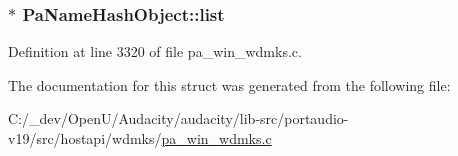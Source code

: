 \subsubsection[{\texorpdfstring{list}{list}}]{$\ast$ Pa\+Name\+Hash\+Object\+::list}\hypertarget{struct_pa_name_hash_object_ada1bf0a5ecdb49c678e1c4bbd1c83ffb}{}\label{struct_pa_name_hash_object_ada1bf0a5ecdb49c678e1c4bbd1c83ffb}


Definition at line 3320 of file pa\+\_\+win\+\_\+wdmks.\+c.



The documentation for this struct was generated from the following file\+:\begin{DoxyCompactItemize}
\item 
C\+:/\+\_\+dev/\+Open\+U/\+Audacity/audacity/lib-\/src/portaudio-\/v19/src/hostapi/wdmks/\hyperlink{pa__win__wdmks_8c}{pa\+\_\+win\+\_\+wdmks.\+c}\end{DoxyCompactItemize}
